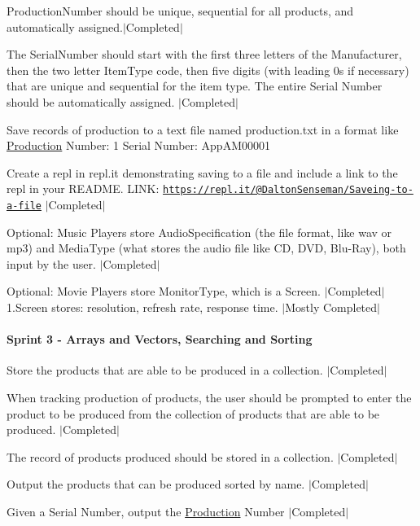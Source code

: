 \begin{DoxyEnumerate}
\begin{DoxyItemize}
\item Production\+Number should be unique, sequential for all products, and automatically assigned.$\vert$\+Completed$\vert$
\item The Serial\+Number should start with the first three letters of the Manufacturer, then the two letter Item\+Type code, then five digits (with leading 0s if necessary) that are unique and sequential for the item type. The entire Serial Number should be automatically assigned. $\vert$\+Completed$\vert$
\item Save records of production to a text file named production.\+txt in a format like \mbox{\hyperlink{struct_production}{Production}} Number\+: 1 Serial Number\+: App\+A\+M00001
\begin{DoxyEnumerate}
\item Create a repl in repl.\+it demonstrating saving to a file and include a link to the repl in your R\+E\+A\+D\+ME. L\+I\+NK\+: \href{https://repl.it/@DaltonSenseman/Saveing-to-a-file}{\tt https\+://repl.\+it/@\+Dalton\+Senseman/\+Saveing-\/to-\/a-\/file} $\vert$\+Completed$\vert$
\end{DoxyEnumerate}
\end{DoxyItemize}
\item Optional\+: Music Players store Audio\+Specification (the file format, like wav or mp3) and Media\+Type (what stores the audio file like CD, D\+VD, Blu-\/\+Ray), both input by the user. $\vert$\+Completed$\vert$
\item Optional\+: Movie Players store Monitor\+Type, which is a Screen. $\vert$\+Completed$\vert$ 1.\+Screen stores\+: resolution, refresh rate, response time. $\vert$\+Mostly Completed$\vert$
\end{DoxyEnumerate}

\paragraph*{Sprint 3 -\/ Arrays and Vectors, Searching and Sorting}


\begin{DoxyEnumerate}
\item Store the products that are able to be produced in a collection. $\vert$\+Completed$\vert$
\item When tracking production of products, the user should be prompted to enter the product to be produced from the collection of products that are able to be produced. $\vert$\+Completed$\vert$
\item The record of products produced should be stored in a collection. $\vert$\+Completed$\vert$
\item Output the products that can be produced sorted by name. $\vert$\+Completed$\vert$
\item Given a Serial Number, output the \mbox{\hyperlink{struct_production}{Production}} Number $\vert$\+Completed$\vert$
\end{DoxyEnumerate}

